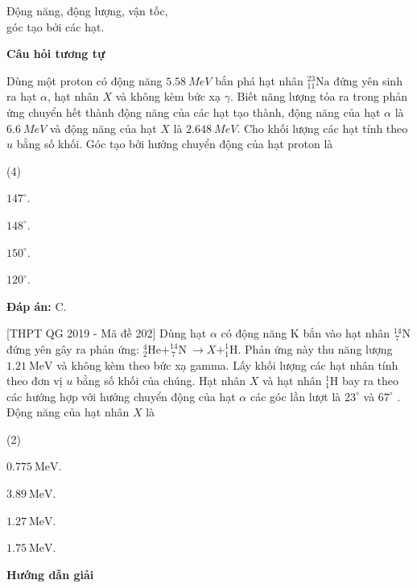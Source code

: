 \begin{dang}{Động năng, động lượng, vận tốc,\\ góc tạo bởi các hạt.}
{		\begin{center}
			\textbf{Câu hỏi tương tự}
		\end{center}				
		Dùng một proton có động năng $ \SI{5,58}{MeV} $ bắn phá hạt nhân $ ^{23}_{11} \text{Na} $ đứng yên sinh ra hạt $ \alpha $, hạt nhân $ X $ và không kèm bức xạ $ \gamma $. Biết năng lượng tỏa ra trong phản ứng chuyển hết thành động năng của các hạt tạo thành, động năng của hạt $ \alpha $ là $ \SI{6,6}{MeV} $	và động năng của hạt $ X $ là $ \SI{2,648}{MeV} $. Cho khối lượng các hạt tính theo $ u $ bằng số khối. Góc tạo bởi hướng chuyển động của hạt proton là
		\begin{mcq}(4)
			\item $ 147^\circ $.
			\item $ 148^\circ $.
			\item $ 150^\circ $.
			\item $ 120^\circ $.
		\end{mcq}
		
		\textbf{Đáp án:} C.}
	
	{
		[THPT QG 2019 - Mã đề 202] Dùng hạt $\alpha$  có động năng K bắn vào hạt nhân  $^{14}_{\ 7}\text{N}$ đứng yên gây ra phản ứng: $^4_2\text{He} + ^{14}_{\ 7}\text{N}\ \rightarrow X + ^1_1\text{H}$. Phản ứng này thu năng lượng $\SI{1,21}{\mega\electronvolt}$ và không kèm theo bức xạ gamma. Lấy khối lượng các hạt nhân tính theo đơn vị $u$ bằng số khối của chúng. Hạt nhân $X$ và hạt nhân $^1_1\text{H}$  bay ra theo các hướng hợp với hướng chuyển động của hạt $\alpha$  các góc lần lượt là $23^\circ$ và $67^\circ$ . Động năng của hạt nhân $X$ là
		
		\begin{mcq}(2)
			\item $\SI{0,775}{\mega\electronvolt}$.
			\item $\SI{3,89}{\mega\electronvolt}$.
			\item $\SI{1,27}{\mega\electronvolt}$.
			\item $\SI{1,75}{\mega\electronvolt}$.
	\end{mcq}}
	{
		\begin{center}
			\textbf{Hướng dẫn giải}
		\end{center}
		
}
\end{dang}
